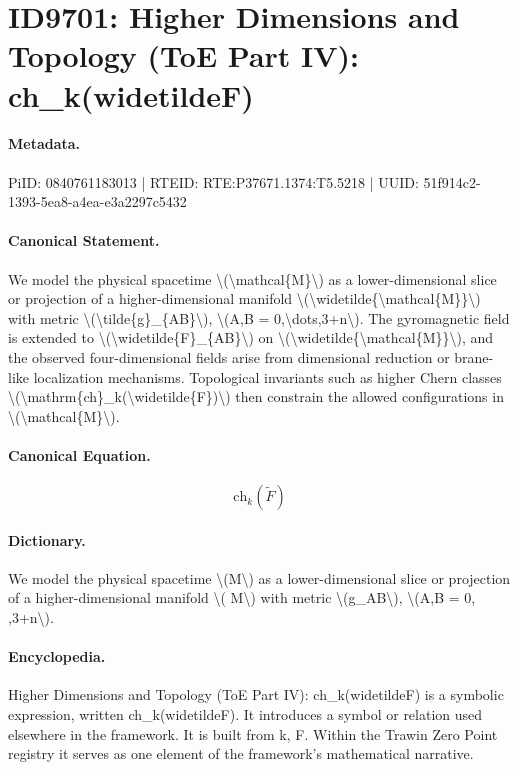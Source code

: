 \section*{ID9701: Higher Dimensions and Topology (ToE Part IV): ch\_k(widetildeF)}
\paragraph{Metadata.}
PiID: 0840761183013 | RTEID: RTE:P37671.1374:T5.5218 | UUID: 51f914c2-1393-5ea8-a4ea-e3a2297c5432

\paragraph{Canonical Statement.}
We model the physical spacetime \textbackslash{}(\textbackslash{}mathcal\{M\}\textbackslash{}) as a lower-dimensional slice or projection of a higher-dimensional manifold \textbackslash{}(\textbackslash{}widetilde\{\textbackslash{}mathcal\{M\}\}\textbackslash{}) with metric \textbackslash{}(\textbackslash{}tilde\{g\}\_\{AB\}\textbackslash{}), \textbackslash{}(A,B = 0,\textbackslash{}dots,3+n\textbackslash{}). The gyromagnetic field is extended to \textbackslash{}(\textbackslash{}widetilde\{F\}\_\{AB\}\textbackslash{}) on \textbackslash{}(\textbackslash{}widetilde\{\textbackslash{}mathcal\{M\}\}\textbackslash{}), and the observed four-dimensional fields arise from dimensional reduction or brane-like localization mechanisms. Topological invariants such as higher Chern classes \textbackslash{}(\textbackslash{}mathrm\{ch\}\_k(\textbackslash{}widetilde\{F\})\textbackslash{}) then constrain the allowed configurations in \textbackslash{}(\textbackslash{}mathcal\{M\}\textbackslash{}).

\paragraph{Canonical Equation.}
\[
\mathrm{ch}_k(\widetilde{F})
\]

\paragraph{Dictionary.}
We model the physical spacetime \textbackslash{}(M\textbackslash{}) as a lower-dimensional slice or projection of a higher-dimensional manifold \textbackslash{}( M\textbackslash{}) with metric \textbackslash{}(g\_AB\textbackslash{}), \textbackslash{}(A,B = 0, ,3+n\textbackslash{}).

\paragraph{Encyclopedia.}
Higher Dimensions and Topology (ToE Part IV): ch\_k(widetildeF) is a symbolic expression, written ch\_k(widetildeF). It introduces a symbol or relation used elsewhere in the framework. It is built from k, F. Within the Trawin Zero Point registry it serves as one element of the framework's mathematical narrative.
